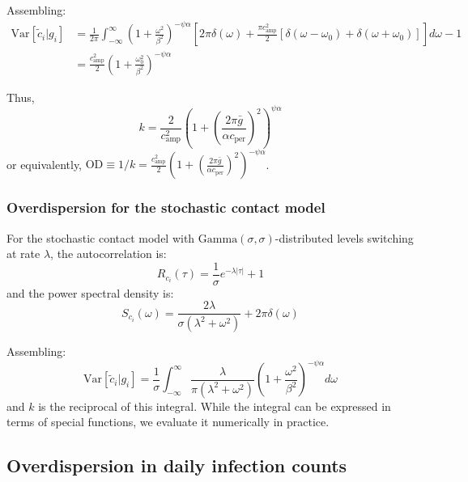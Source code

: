 \documentclass[10pt]{article}
\begin{document}
Assembling:
\begin{align}
\text{Var}[\tilde{c}_i | g_i] &= \frac{1}{2\pi} \int_{-\infty}^\infty \left(1 + \frac{\omega^2}{\beta^2}\right)^{-\psi \alpha}
\left[ 2 \pi \delta(\omega) + \frac{\pi c_\text{amp}^2}{2} [\delta(\omega - \omega_0) + \delta(\omega + \omega_0)] \right] d \omega  - 1 \nonumber \\
&= \frac{c_\text{amp}^2}{2} \left(1 + \frac{\omega_0^2}{\beta^2}\right)^{-\psi \alpha}
\end{align}

Thus,
\begin{equation}
	\boxed{k = \frac{2}{c_\text{amp}^2} \left(1 + \left(\frac{2\pi\bar{g}}{\alpha c_\text{per}}\right)^2\right)^{\psi \alpha}}
\end{equation}
or equivalently, $\text{OD} \equiv 1/k = \frac{c_\text{amp}^2}{2}\left(1 + \left(\frac{2\pi\bar{g}}{\alpha c_\text{per}}\right)^2\right)^{-\psi\alpha}$.

\subsubsection{Overdispersion for the stochastic contact model}

For the stochastic contact model with $\text{Gamma}(\sigma,\sigma)$-distributed levels switching at rate $\lambda$, the autocorrelation is:
\begin{equation}
	R_{c_i}(\tau) = \frac{1}{\sigma} e^{-\lambda |\tau|} + 1
\end{equation}
and the power spectral density is:
\begin{equation}
	S_{c_i}(\omega) = \frac{2 \lambda}{\sigma (\lambda^2 + \omega^2)} + 2\pi \delta(\omega)
\end{equation}

Assembling:
\begin{equation}
\text{Var}[\tilde{c}_i | g_i] = \frac{1}{\sigma}\int_{-\infty}^{\infty} \frac{\lambda}{\pi (\lambda^2 + \omega^2)} \left( 1 + \frac{\omega^2}{\beta^2}\right)^{-\psi \alpha} d\omega
\end{equation}
and $k$ is the reciprocal of this integral. While the integral can be expressed in terms of special functions, we evaluate it numerically in practice.


\subsection{Overdispersion in daily infection counts}
\label{sec:supp_daily_overdispersion}
\end{document}
